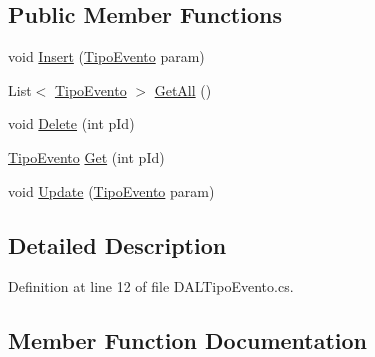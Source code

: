 \subsection*{Public Member Functions}
\begin{DoxyCompactItemize}
\item 
void \hyperlink{classprj_progra_i_i_i_1_1_layer_1_1_d_a_l_1_1_d_a_l_tipo_evento_a890327fb7a414d8f67033f6036227418}{Insert} (\hyperlink{classprj_progra_i_i_i_1_1_layer_1_1_entities_1_1_tipo_evento}{Tipo\+Evento} param)
\item 
List$<$ \hyperlink{classprj_progra_i_i_i_1_1_layer_1_1_entities_1_1_tipo_evento}{Tipo\+Evento} $>$ \hyperlink{classprj_progra_i_i_i_1_1_layer_1_1_d_a_l_1_1_d_a_l_tipo_evento_afc72a91b1a8484b317932a6f01c42815}{Get\+All} ()
\item 
void \hyperlink{classprj_progra_i_i_i_1_1_layer_1_1_d_a_l_1_1_d_a_l_tipo_evento_aa48ad58ea22d864d798ac515bb81f899}{Delete} (int p\+Id)
\item 
\hyperlink{classprj_progra_i_i_i_1_1_layer_1_1_entities_1_1_tipo_evento}{Tipo\+Evento} \hyperlink{classprj_progra_i_i_i_1_1_layer_1_1_d_a_l_1_1_d_a_l_tipo_evento_a43ec574ca3071e7b497613178a67a0fe}{Get} (int p\+Id)
\item 
void \hyperlink{classprj_progra_i_i_i_1_1_layer_1_1_d_a_l_1_1_d_a_l_tipo_evento_a1265817c512c688caab86130dd21b39a}{Update} (\hyperlink{classprj_progra_i_i_i_1_1_layer_1_1_entities_1_1_tipo_evento}{Tipo\+Evento} param)
\end{DoxyCompactItemize}


\subsection{Detailed Description}


Definition at line 12 of file D\+A\+L\+Tipo\+Evento.\+cs.



\subsection{Member Function Documentation}
\hypertarget{classprj_progra_i_i_i_1_1_layer_1_1_d_a_l_1_1_d_a_l_tipo_evento_aa48ad58ea22d864d798ac515bb81f899}{}\label{classprj_progra_i_i_i_1_1_layer_1_1_d_a_l_1_1_d_a_l_tipo_evento_aa48ad58ea22d864d798ac515bb81f899} 
